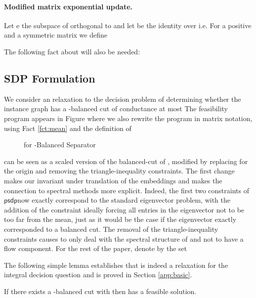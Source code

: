 \documentclass[twoside,leqno,twocolumn]{article}
\newcommand{\BS}{{\sc Balanced Separator}\xspace}
\newcommand{\SDP}{{\sf SDP}\xspace}
\numberwithin{equation}{section}
\newcommand{\psdp}{{\ensuremath{{\mathsf{psdp}}}\xspace}}
\begin{document}
\paragraph{Modified matrix exponential update.}
Let  e the subspace of  orthogonal to  and let  be the identity over  i.e. 
 For a positive  and a symmetric matrix  we define 

The following fact about  will also be needed:
\begin{fact}\label{fct:identity}

\end{fact}

\subsection{\SDP Formulation} \label{sec:sdp}

We consider an  relaxation to the decision problem of determining whether the instance graph  has a -balanced cut of conductance at most 
The  feasibility program  appears in Figure  where we also rewrite the program in matrix notation, using Fact \ref{fct:mean} and the definition of 
\begin{figure}[htb]

\begin{minipage}[b]{0.5\linewidth}

\end{minipage}
\begin{minipage}[b]{0.5\linewidth}

\end{minipage}
\label{fig:sdp}
\caption{ for -\BS}
\end{figure}
 can be seen as a scaled version of the balanced-cut  of \cite{ARV}, modified by replacing  for the origin and removing the triangle-inequality constraints. The first change makes our  invariant under translation of the embeddings and makes the connection to spectral methods more explicit. Indeed, the first two constraints of \psdp now exactly correspond to the standard eigenvector problem, with the addition of the  constraint ideally forcing all entries in the eigenvector not to be too far from the mean, just as it would be the case if the eigenvector exactly corresponded to a balanced cut. 
The removal of the triangle-inequality constraints causes  to only deal with the spectral structure of  and not to have a flow component.
For the rest of the paper, denote by  the set 

\noindent
The following simple lemma establishes that  is indeed a relaxation for the integral decision question  and is proved in Section \ref{app:basic}. 
\begin{lemma}\label{lem:relax} If there exists a -balanced cut  with  then  has a feasible solution.
\end{lemma}
\end{document}
